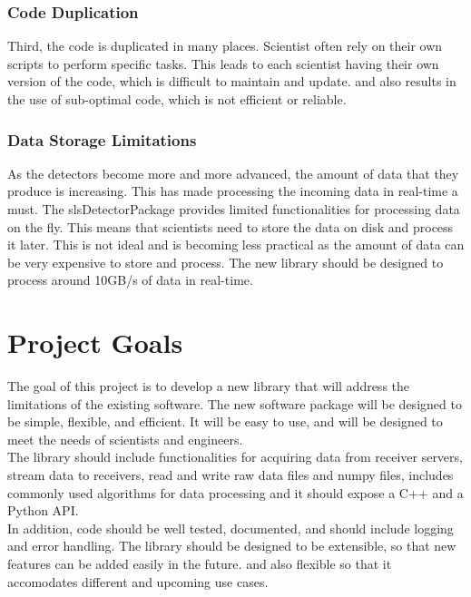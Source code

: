 \begin{spacing}{1.2}
    \subsubsection{Code Duplication}
    Third, the code is duplicated in many places. Scientist often rely on their own scripts to perform specific tasks.
    This leads to each scientist having their own version of the code, which is difficult to maintain and update.
    and also results in the use of sub-optimal code, which is not efficient or reliable.


    \subsubsection{Data Storage Limitations}
    As the detectors become more and more advanced, the amount of data that they produce is increasing.
    This has made processing the incoming data in real-time a must. The slsDetectorPackage provides limited
    functionalities for processing data on the fly. This means that scientists need to store the data on disk
    and process it later. This is not ideal and is becoming less practical as the amount of data can be very expensive to
    store and process. The new library should be designed to process around 10GB/s of data in real-time.

    \section{Project Goals}
    The goal of this project is to develop a new library that will address the limitations of the existing software.
    The new software package will be designed to be simple, flexible, and efficient. It will be easy to use, and will be
    designed to meet the needs of scientists and engineers. \\

    The library should include functionalities for acquiring data from receiver servers, stream data to receivers,
    read and write raw data files and numpy files, includes commonly used algorithms for data processing and it should
    expose a C++ and a Python API. \\

    In addition, code should be well tested, documented, and should include logging and error handling.
    The library should be designed to be extensible, so that new features can be added easily in the future.
    and also flexible so that it accomodates different and upcoming use cases. \\


\end{spacing}
